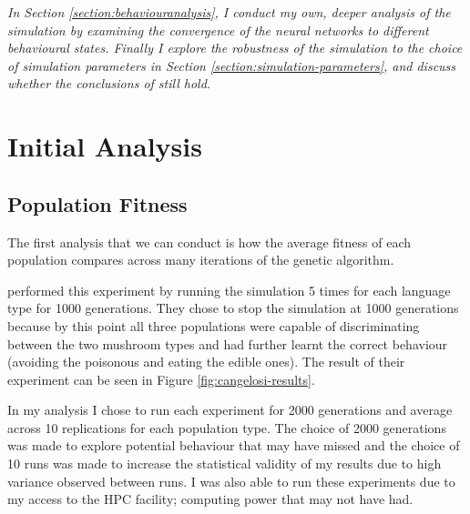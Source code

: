\documentclass[12pt,a4paper]{report}
\begin{document}
\emph{In Section \ref{section:behaviouranalysis}, I conduct my own, deeper analysis of the simulation by examining the convergence of the neural networks to different behavioural states. Finally I explore the robustness of the simulation to the choice of simulation parameters in Section \ref{section:simulation-parameters}, and discuss whether the conclusions of \citet{Cangelosi1998} still hold.}

\section{Initial Analysis}

\subsection{Population Fitness}\label{section:popfit}
 
The first analysis that we can conduct is how the average fitness of each population compares across many iterations of the genetic algorithm.

\citet{Cangelosi1998} performed this experiment by running the simulation 5 times for each language type for 1000 generations. They chose to stop the simulation at 1000 generations because by this point all three populations were capable of discriminating between the two mushroom types and had further learnt the correct behaviour (avoiding the poisonous and eating the edible ones). The result of their experiment can be seen in Figure \ref{fig:cangelosi-results}.

In my analysis I chose to run each experiment for 2000 generations and average across 10 replications for each population type. The choice of 2000 generations was made to explore potential behaviour that \citet{Cangelosi1998} may have missed and the choice of 10 runs was made to increase the statistical validity of my results due to high variance observed between runs. I was also able to run these experiments due to my access to the HPC facility; computing power that \citet{Cangelosi1998} may not have had. 
\end{document}
